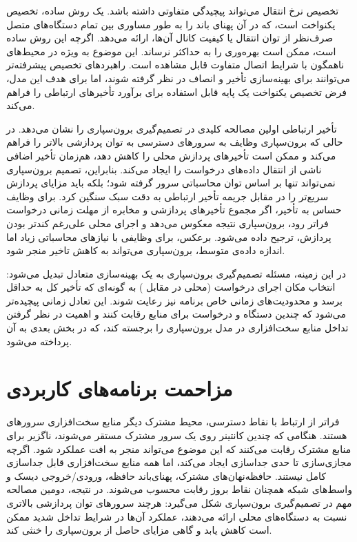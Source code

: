 تخصیص نرخ انتقال می‌تواند پیچیدگی متفاوتی داشته باشد. یک روش ساده، تخصیص یکنواخت است، که در آن  پهنای باند را به طور مساوری بین تمام دستگاه‌های متصل صرف‌نظر از توان انتقال یا کیفیت کانال آن‌ها، ارائه می‌دهد. اگرچه این روش ساده است، ممکن است بهره‌وری را به حداکثر نرساند. این موضوع به ویژه در محیط‌های ناهمگون با شرایط اتصال متفاوت قابل مشاهده است. راهبردهای تخصیص پیشرفته‌تر می‌توانند برای بهینه‌سازی تأخیر و انصاف در نظر گرفته شوند، اما برای هدف این مدل، فرض تخصیص یکنواخت یک پایه قابل استفاده برای برآورد تأخیرهای ارتباطی را فراهم می‌کند.

تأخیر ارتباطی اولین مصالحه کلیدی در تصمیم‌گیری برون‌سپاری را نشان می‌دهد. در حالی که برون‌سپاری وظایف به سرورهای  دسترسی به توان پردازشی بالاتر را فراهم می‌کند و ممکن است تأخیرهای پردازش محلی را کاهش دهد، هم‌زمان تأخیر اضافی ناشی از انتقال ‌داده‌های درخواست را ایجاد می‌کند. بنابراین، تصمیم برون‌سپاری نمی‌تواند تنها بر اساس توان محاسباتی سرور  گرفته شود؛ بلکه باید مزایای پردازش سریع‌تر را در مقابل جریمه‌ تأخیر ارتباطی به دقت سبک سنگین کرد. برای وظایف حساس به تأخیر، اگر مجموع تأخیرهای پردازشی و مخابره از مهلت زمانی درخواست فراتر رود، برون‌سپاری نتیجه معکوس می‌دهد و اجرای محلی علی‌رغم کندتر بودن پردازش، ترجیح داده می‌شود. برعکس، برای وظایفی با نیازهای محاسباتی زیاد اما اندازه داده‌ی متوسط، برون‌سپاری می‌تواند به کاهش تاخیر منجر شود.

در این زمینه، مسئله تصمیم‌گیری برون‌سپاری به یک بهینه‌سازی متعادل تبدیل می‌شود: انتخاب مکان اجرای درخواست (محلی در مقابل ) به گونه‌ای که تأخیر کل به حداقل برسد و محدودیت‌های زمانی خاص برنامه نیز رعایت شوند. این تعادل زمانی پیچیده‌تر می‌شود که چندین دستگاه و درخواست برای منابع  رقابت کنند و اهمیت در نظر گرفتن تداخل منابع سخت‌افزاری در مدل برون‌سپاری را برجسته کند، که در بخش‌ بعدی به آن پرداخته می‌شود.

\section{مزاحمت برنامه‌های کاربردی}
\label{subsec:interference_model}

فراتر از ارتباط با نقاط دسترسی، محیط مشترک دیگر منابع سخت‌افزاری سرورهای  هستند. هنگامی که چندین کانتینر روی یک سرور مشترک مستقر می‌شوند، ناگزیر برای منابع مشترک رقابت می‌کنند که این موضوع می‌تواند منجر به افت عملکرد شود. اگرچه مجازی‌سازی تا حدی جداسازی ایجاد می‌کند، اما همه منابع سخت‌افزاری قابل جداسازی کامل نیستند. حافظه‌نهان‌های مشترک، پهنای‌باند حافظه، ورودی/خروجی دیسک و واسط‌های شبکه همچنان نقاط بروز رقابت محسوب می‌شوند. در نتیجه، دومین مصالحه مهم در تصمیم‌گیری برون‌سپاری شکل می‌گیرد: هرچند سرورهای  توان پردازشی بالاتری نسبت به دستگاه‌های محلی ارائه می‌دهند، عملکرد آن‌ها در شرایط تداخل شدید ممکن است کاهش یابد و گاهی مزایای حاصل از برون‌سپاری را خنثی کند.

